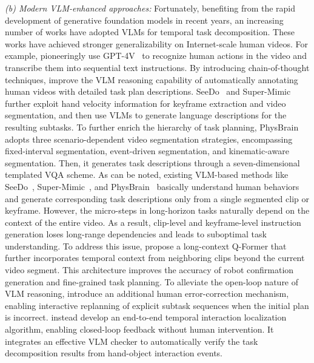 \documentclass[Afour,sageh,times]{sagej}
\begin{document}
\textit{(b) Modern VLM-enhanced approaches:} Fortunately, benefiting from the rapid development of generative foundation models in recent years, an increasing number of works have adopted VLMs for temporal task decomposition. These works have achieved stronger generalizability on Internet-scale human videos. For example, \cite{wake2024gpt} pioneeringly use GPT-4V~\citep{achiam2023gpt} to recognize human actions in the video and transcribe them into sequential text instructions.
By introducing chain-of-thought techniques, \cite{clark2025action} improve the VLM reasoning capability of automatically annotating human videos with detailed task plan descriptions. SeeDo~\citep{wang2024vlm} and Super-Mimic~\citep{ye2025watch} further exploit hand velocity information for keyframe extraction and video segmentation, and then use VLMs to generate language descriptions for the resulting subtasks. 
To further enrich the hierarchy of task planning, PhysBrain~\citep{lin2025physbrain} adopts three scenario-dependent video segmentation strategies, encompassing fixed-interval segmentation, event-driven segmentation, and kinematic-aware segmentation. Then, it generates task descriptions through a seven-dimensional templated VQA scheme. As can be noted, existing VLM-based methods like SeeDo~\citep{wang2024vlm}, Super-Mimic~\citep{ye2025watch}, and PhysBrain~\citep{lin2025physbrain} basically understand human behaviors and generate corresponding task descriptions only from a single segmented clip or keyframe. However, the micro-steps in long-horizon tasks naturally depend on the context of the entire video. As a result, clip-level and keyframe-level instruction generation loses long-range dependencies and leads to suboptimal task understanding. To address this issue, \cite{hori2025robot} propose a long-context Q-Former that further incorporates temporal context from neighboring clips beyond the current video segment. This architecture improves the accuracy of robot confirmation generation and fine-grained task planning. To alleviate the open-loop nature of VLM reasoning, \cite{hori2025interactive} introduce an additional human error-correction mechanism, enabling interactive replanning of explicit subtask sequences when the initial plan is incorrect. \cite{ma2025egoloc} instead develop an end-to-end temporal interaction localization algorithm, enabling closed-loop feedback without human intervention. It integrates an effective VLM checker to automatically verify the task decomposition results from hand-object interaction events.
\end{document}
